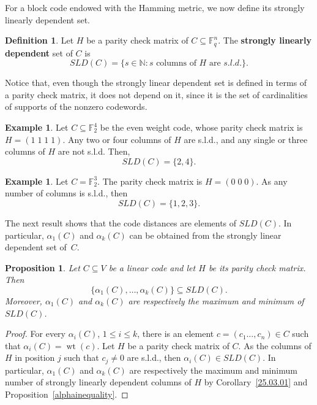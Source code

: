 \documentclass[12pt]{amsart}
\numberwithin{equation}{section}
\DeclareMathOperator{\wt}{wt}
\newtheorem{proposition}[theorem]{Proposition}
\theoremstyle{definition}
\newtheorem{definition}[theorem]{Definition}
\newtheorem{example}[theorem]{Example}
\newcommand{\FF}{\mathbb{F}}
\begin{document}
For a block code endowed with the Hamming metric, we now define its strongly linearly dependent set. 

\begin{definition}
Let $H$ be a parity check matrix of $C \subseteq \FF_q^n$. The {\bf strongly linearly dependent} set of $C$ is
\[SLD(C) = \{ s \in \mathbb{N} : s \text{ columns of } H \text{ are } s.l.d. \}.\]
\end{definition}

Notice that, even though the strongly linear dependent set is defined in terms of a parity check matrix, it does not depend on it, since it is the set of cardinalities of supports of the nonzero codewords.

\begin{example}\label{25.03.07}
Let $C\subseteq \FF_2^4$ be the even weight code, whose parity check matrix is $H=(1\; 1\; 1\; 1)$. Any two or four columns of $H$ are s.l.d., and any single or three columns of $H$ are not s.l.d. Then,
\[SLD(C) = \{2,4\}.\]
\end{example}

\begin{example}\label{25.03.08}
Let $C = \FF_2^3$. The parity check matrix is $H=(0\; 0\; 0)$. As any number of columns is s.l.d., then
\[SLD(C) = \{1,2,3\}.\]
\end{example}

The next result shows that the code distances are elements of $SLD(C)$. In particular, $\alpha_1(C)$ and $\alpha_k(C)$ can be obtained from the strongly linear dependent set of~$C$.

\begin{proposition}\label{alpha strong}
Let $C \subseteq V$ be a linear code and let $H$ be its parity check matrix. Then
\[\{\alpha_1(C), \ldots, \alpha_k(C)\} \subseteq SLD(C).\]
Moreover, $\alpha_1(C)$ and $\alpha_k(C)$ are respectively the maximum and minimum of $SLD(C)$.
\end{proposition}

\begin{proof}
For every $\alpha_i(C)$, $1\leq i\leq k$, there is an element $c=(c_1\ldots,c_n) \in C$ such that $\alpha_i(C) = \wt(c)$. Let $H$ be a parity check matrix of $C$. As the columns of $H$ in position $j$ such that $c_j \neq 0$ are s.l.d., then $\alpha_i(C) \in SLD(C)$. In particular, $\alpha_1(C)$ and $\alpha_k(C)$ are respectively the maximum and minimum number of strongly linearly dependent columns of $H$ by Corollary~\ref{25.03.01} and Proposition~\ref{alphainequality}.
\end{proof}
\end{document}
